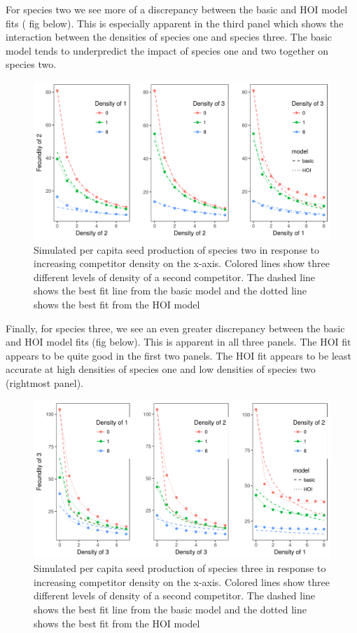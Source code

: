 \documentclass[12pt,]{article}
\begin{document}
For species two we see more of a discrepancy between the basic and HOI
model fits ( fig below). This is especially apparent in the third panel
which shows the interaction between the densities of species one and
species three. The basic model tends to underpredict the impact of
species one and two together on species two.

\begin{figure}
\centering
\includegraphics{../figures/species_2_fits_three_species.png}
\caption{Simulated per capita seed production of species two in response
to increasing competitor density on the x-axis. Colored lines show three
different levels of density of a second competitor. The dashed line
shows the best fit line from the basic model and the dotted line shows
the best fit from the HOI model}
\end{figure}

Finally, for species three, we see an even greater discrepancy between
the basic and HOI model fits (fig below). This is apparent in all three
panels. The HOI fit appears to be quite good in the first two panels.
The HOI fit appears to be least accurate at high densities of species
one and low densities of species two (rightmost panel).

\begin{figure}
\centering
\includegraphics{../figures/species_3_fits_three_species.png}
\caption{Simulated per capita seed production of species three in
response to increasing competitor density on the x-axis. Colored lines
show three different levels of density of a second competitor. The
dashed line shows the best fit line from the basic model and the dotted
line shows the best fit from the HOI model}
\end{figure}
\end{document}
